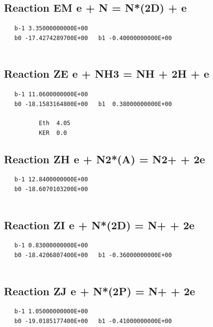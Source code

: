 \documentclass[12pt]{article}
\begin{document}
\subsection{
Reaction EM e + N = N*(2D) + e }
\begin{small}\begin{verbatim}
   b-1 3.35000000000E+00
   b0 -17.4274289700E+00   b1 -0.40000000000E+00


\end{verbatim}\end{small}
\newpage

\subsection{
Reaction ZE e + NH3 = NH + 2H + e }
\begin{small}\begin{verbatim}
   b-1 11.0600000000E+00
   b0 -18.1583164800E+00   b1  0.38000000000E+00

          Eth  4.05
          KER  0.0

\end{verbatim}\end{small}
\newpage

\subsection{
Reaction ZH e + N2*(A) = N2+ + 2e }
\begin{small}\begin{verbatim}
   b-1 12.8400000000E+00
   b0 -18.6070103200E+00


\end{verbatim}\end{small}
\newpage

\subsection{
Reaction ZI e + N*(2D) = N+ + 2e }
\begin{small}\begin{verbatim}
   b-1 0.83000000000E+00
   b0 -18.4206807400E+00   b1 -0.36000000000E+00


\end{verbatim}\end{small}
\newpage

\subsection{
Reaction ZJ e + N*(2P) = N+ + 2e }
\begin{small}\begin{verbatim}
   b-1 1.05000000000E+00
   b0 -19.0185177400E+00   b1 -0.41000000000E+00
\end{verbatim}\end{small}
\newpage
\end{document}
